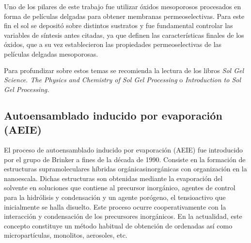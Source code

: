 	 Uno de los pilares de este trabajo fue utilizar óxidos mesoporosos procesados en forma de películas delgadas para obtener membranas permeoselectivas. Para este fin el sol se depositó sobre distintos sustratos y fue fundamental controlar las variables de síntesis antes citadas, ya que definen las características finales de los óxidos, que a su vez establecieron las propiedades permeoselectivas de las películas delgadas mesoporosas.

	 Para profundizar sobre estos temas se recomienda la lectura de los libros \textit{Sol Gel Science. The Physics and Chemistry of Sol Gel Processing}\cite{Wright2001} o \textit{Introduction to Sol Gel Processing.} \cite{Pierre1998} 
	
	\subsection{Autoensamblado inducido por evaporación (AEIE)}

	 El proceso de autoensamblado inducido por evaporación (AEIE) fue introducido por el grupo de Brinker a fines de la década de 1990.\cite{Lu1997,Brinker1999} Consiste en la formación de estructuras supramoleculares híbridas orgánicas\textbar inorgánicas con organización en la nanoescala. Dichas estructuras son obtenidas mediante la evaporación del solvente en soluciones que contiene al precursor inorgánico, agentes de control para la hidrólisis y condensación y un agente porógeno, el tensioactivo que inicialmente se halla disuelto. Este proceso ocurre cooperativamente con la interacción y condensación de los precursores inorgánicos. En la actualidad, este concepto constituye un método habitual de obtención de \pdm\space ordenadas\cite{Grosso2004} así como micropartículas, monolitos, aerosoles, etc.\cite{Yang1998a}



